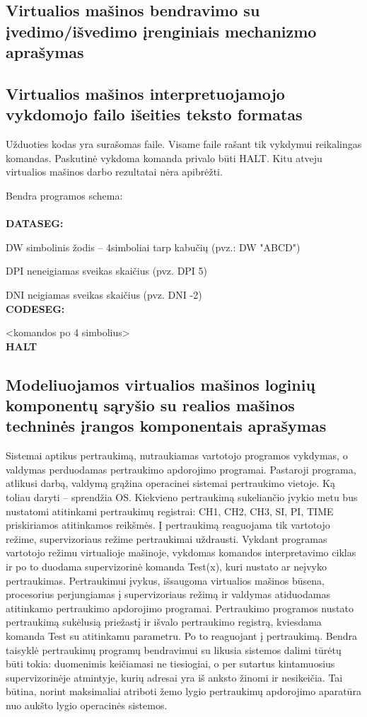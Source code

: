 \subsection{Virtualios mašinos bendravimo su įvedimo/išvedimo įrenginiais
mechanizmo aprašymas}



\subsection{Virtualios mašinos interpretuojamojo vykdomojo failo išeities 
teksto formatas}

Užduoties kodas yra surašomas faile. Visame faile rašant tik vykdymui reikalingas
komandas. Paskutinė vykdoma komanda privalo būti HALT. Kitu atveju virtualios mašinos darbo
rezultatai nėra apibrėžti.

Bendra programos schema:\\
\\\textbf{DATASEG:}

DW simbolinis žodis – 4simboliai tarp kabučių (pvz.: DW "ABCD")

DPI neneigiamas sveikas skaičius (pvz. DPI 5)

DNI neigiamas sveikas skaičius (pvz. DNI -2)
\\\textbf{CODESEG:}

<komandos po 4 simbolius>\\
\textbf{HALT}

\subsection{Modeliuojamos virtualios mašinos loginių komponentų sąryšio su 
realios mašinos techninės įrangos komponentais aprašymas}

Sistemai aptikus pertraukimą, nutraukiamas vartotojo programos vykdymas, o valdymas perduodamas pertraukimo apdorojimo programai. Pastaroji programa, atlikusi darbą, valdymą grąžina operacinei sistemai pertraukimo vietoje.  Ką toliau daryti – sprendžia OS. Kiekvieno pertraukimą sukeliančio įvykio metu bus nustatomi atitinkami pertraukimų registrai: CH1, CH2, CH3, SI, PI, TIME priskiriamos atitinkamos reikšmės. 
Į pertraukimą reaguojama tik vartotojo režime, supervizoriaus režime pertraukimai uždrausti. Vykdant programas vartotojo režimu virtualioje mašinoje, vykdomas komandos interpretavimo ciklas ir po to duodama supervizorinė komanda Test(x), kuri  nustato ar neįvyko pertraukimas. 
Pertraukimui įvykus, išsaugoma virtualios mašinos būsena, procesorius perjungiamas į supervizoriaus režimą ir valdymas atiduodamas atitinkamo pertraukimo apdorojimo programai.
Pertraukimo programos nustato pertraukimą sukėlusią priežastį ir išvalo pertraukimo registrą, kviesdama komanda Test su atitinkamu parametru. Po  to reaguojant į pertraukimą.
Bendra taisyklė pertraukimų programų bendravimui su likusia sistemos dalimi tūrėtų būti tokia: duomenimis keičiamasi ne tiesiogiai, o per sutartus kintamuosius supervizorinėje atmintyje, kurių adresai yra iš anksto žinomi ir nesikeičia. Tai būtina, norint maksimaliai atriboti žemo lygio pertraukimų apdorojimo aparatūra nuo aukšto lygio operacinės sistemos.
   

